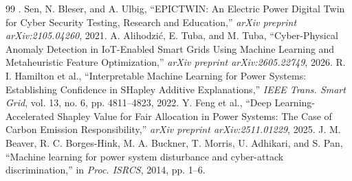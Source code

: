 \documentclass[10pt, a4paper, twocolumn]{article}
\begin{document}
\begin{thebibliography}{99}
 . Sen, N. Bleser, and A. Ulbig, ``EPICTWIN: An Electric Power Digital Twin for Cyber Security Testing, Research and Education,'' \textit{arXiv preprint arXiv:2105.04260}, 2021.
 A. Alihodzi\'{c}, E. Tuba, and M. Tuba, ``Cyber-Physical Anomaly Detection in IoT-Enabled Smart Grids Using Machine Learning and Metaheuristic Feature Optimization,'' \textit{arXiv preprint arXiv:2605.22749}, 2026.
 R. I. Hamilton et al., ``Interpretable Machine Learning for Power Systems: Establishing Confidence in SHapley Additive Explanations,'' \textit{IEEE Trans. Smart Grid}, vol. 13, no. 6, pp. 4811--4823, 2022.
 Y. Feng et al., ``Deep Learning-Accelerated Shapley Value for Fair Allocation in Power Systems: The Case of Carbon Emission Responsibility,'' \textit{arXiv preprint arXiv:2511.01229}, 2025.
 J. M. Beaver, R. C. Borges-Hink, M. A. Buckner, T. Morris, U. Adhikari, and S. Pan, ``Machine learning for power system disturbance and cyber-attack discrimination,'' in \textit{Proc. ISRCS}, 2014, pp. 1--6.
\end{thebibliography}
\end{document}
